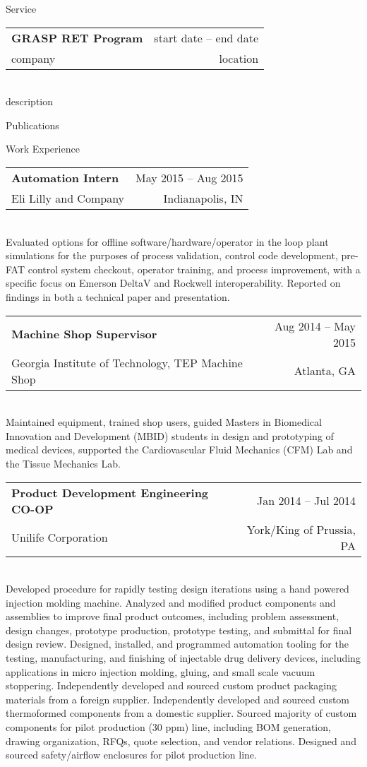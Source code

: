 \documentclass[10pt, letter]{article}
\makeatletter
\newenvironment{cvsection}[1]{
    {\Large #1}
    \vspace{.1cm}
    
}{
}
\newcommand{\cvitem}[6]{
    \strut\hfill\begin{minipage}{\dimexpr\textwidth-1cm}
    \begin{tabular*}{\linewidth}{@{}l@{\extracolsep{\fill}}r@{}}
        \textbf{#1} & #4 -- #5\\
        #2 & #3\\
    \end{tabular*}\\[.05cm]
    #6
    \end{minipage}
    \vspace{.3cm}
}
\makeatother
\begin{document}
\begin{cvsection}{Service}
    \cvitem{GRASP RET Program}{company}{location}{start date}{end date}{description}
\end{cvsection}

\begin{cvsection}{Publications}
    
\end{cvsection}

\begin{cvsection}{Work Experience}
    \cvitem{Automation Intern}{Eli Lilly and Company}{Indianapolis, IN}{May 2015}{Aug 2015}{Evaluated options for offline software/hardware/operator in the loop plant simulations for the purposes of process validation, control code development, pre-FAT control system checkout, operator training, and process improvement, with a specific focus on Emerson DeltaV and Rockwell interoperability. Reported on findings in both a technical paper and presentation.}

    \cvitem{Machine Shop Supervisor}{Georgia Institute of Technology, TEP Machine Shop}{Atlanta, GA}{Aug 2014}{May 2015}{Maintained equipment, trained shop users, guided Masters in Biomedical Innovation and Development (MBID) students in design and prototyping of medical devices, supported the Cardiovascular Fluid Mechanics (CFM) Lab and the Tissue Mechanics Lab. }
    
    \cvitem{Product Development Engineering CO-OP}{Unilife Corporation}{York/King of Prussia, PA}{Jan 2014}{Jul 2014}{
    Developed procedure for rapidly testing design iterations using a hand powered injection molding machine. 
    Analyzed and modified product components and assemblies to improve final product outcomes, including problem assessment, design changes, prototype production, prototype testing, and submittal for final design review. 
    Designed, installed, and programmed automation tooling for the testing, manufacturing, and finishing of injectable drug delivery devices, including applications in micro injection molding, gluing, and small scale vacuum stoppering. 
    Independently developed and sourced custom product packaging materials from a foreign supplier.
    Independently developed and sourced custom thermoformed components from a domestic supplier. 
    Sourced majority of custom components for pilot production (30 ppm) line, including BOM generation, drawing organization, RFQs, quote selection, and vendor relations. 
    Designed and sourced safety/airflow enclosures for pilot production line.}


\end{cvsection}
\end{document}
